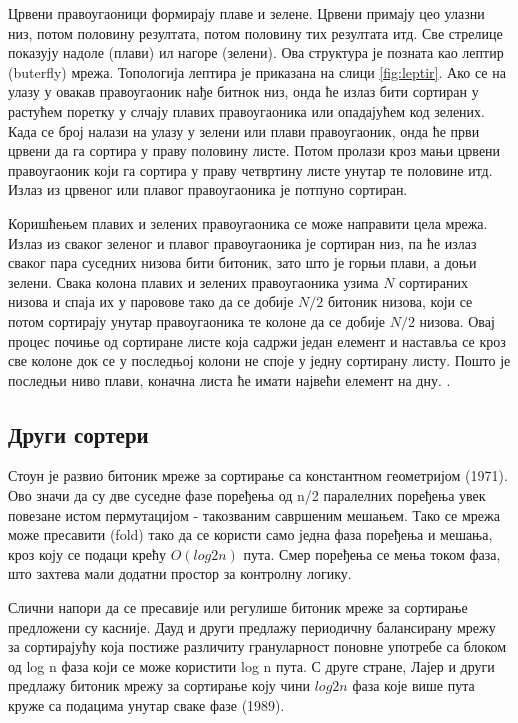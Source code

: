 \documentclass[12pt, a4paper]{article}
\theoremstyle{definition}
\begin{document}
Црвени правоугаоници формирају плаве и зелене. Црвени примају цео улазни низ, потом половину резултата, потом половину тих резултата итд. Све стрелице показују надоле (плави) ил нагоре (зелени). Ова структура је позната као лептир (buterfly) мрежа. Топологија лептира је приказана на слици \ref{fig:leptir}. Ако се на улазу у овакав правоугаоник нађе битнок низ, онда ће излаз бити сортиран у растућем поретку у слчају плавих правоугаоника или опадајућем код зелених. Када се број налази на улазу у зелени или плави правоугаоник, онда ће први црвени да га сортира у праву половину листе. Потом пролази кроз мањи црвени правоугаоник који га сортира у праву четвртину листе унутар те половине итд. Излаз из црвеног или плавог правоугаоника је потпуно сортиран.

Коришћењем плавих и зелених правоугаоника се може направити цела мрежа. Излаз из сваког зеленог и плавог правоугаоника је сортиран низ, па ће излаз сваког пара суседних низова бити битоник, зато што је горњи плави, а доњи зелени. Свака колона плавих и зелених правоугаоника узима $N$ сортираних низова и спаја их у паровове тако да се добије $N/2$ битоник низова, који се потом сортирају унутар правоугаоника те колоне да се добије $N/2$ низова. Овај процес почиње од сортиране листе која садржи један елемент и наставља се кроз све колоне док се у последњој колони не споје у једну сортирану листу. Пошто је последњи ниво плави, коначна листа ће имати највећи елемент на дну. \cite{wiki_bitonic}.

\subsection{Други сортери}
Стоун \cite{stone} је развио битоник мреже за сортирање са константном геометријом (1971). Ово значи да су две суседне фазе поређења од n/2 паралелних поређења увек повезане истом пермутацијом - такозваним савршеним мешањем. Тако се мрежа може пресавити (fold) тако да се користи само једна фаза поређења и мешања, кроз коју се подаци крећу $O(log2 n)$ пута. Смер поређења се мења током фаза, што захтева мали додатни простор за контролну логику.

Слични напори да се пресавије или регулише битоник мреже за сортирање предложени су касније. Дауд и други \cite{dowd} предлажу периодичну балансирану мрежу за сортирајућу која постиже различиту грануларност поновне употребе са блоком од log n фаза који се може користити log n пута. С друге стране, Лајер и други \cite{layer07} предлажу битоник мрежу за сортирање коју чини $log2 n$ фаза које више пута круже са подацима унутар сваке фазе (1989).
\end{document}

